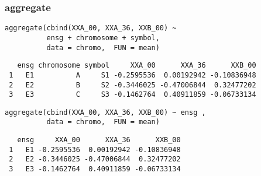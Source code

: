 \documentclass[xcolor={usenames,svgnames,dvipsnames}]{beamer}
\begin{document}
\begin{frame}[fragile]
\frametitle{aggregate}
\label{sec-3-8}


\lstset{language=R}
\begin{lstlisting}
aggregate(cbind(XXA_00, XXA_36, XXB_00) ~
          ensg + chromosome + symbol,
          data = chromo,  FUN = mean)
\end{lstlisting}

\begin{verbatim}
   ensg chromosome symbol     XXA_00      XXA_36      XXB_00
 1   E1          A     S1 -0.2595536  0.00192942 -0.10836948
 2   E2          B     S2 -0.3446025 -0.47006844  0.32477202
 3   E3          C     S3 -0.1462764  0.40911859 -0.06733134
\end{verbatim}


\lstset{language=R}
\begin{lstlisting}
aggregate(cbind(XXA_00, XXA_36, XXB_00) ~ ensg ,
          data = chromo,  FUN = mean)
\end{lstlisting}

\begin{verbatim}
   ensg     XXA_00      XXA_36      XXB_00
 1   E1 -0.2595536  0.00192942 -0.10836948
 2   E2 -0.3446025 -0.47006844  0.32477202
 3   E3 -0.1462764  0.40911859 -0.06733134
\end{verbatim}
\end{frame}
\end{document}
